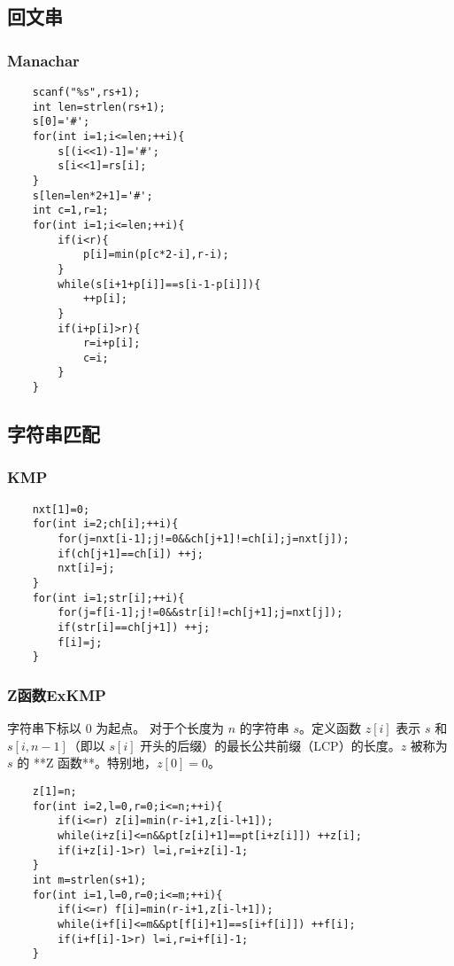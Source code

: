 \documentclass[UTF8]{ctexart}
\begin{document}
\subsection{回文串}
\subsubsection{Manachar}
\begin{lstlisting}
	scanf("%s",rs+1);
	int len=strlen(rs+1);
	s[0]='#';
	for(int i=1;i<=len;++i){
		s[(i<<1)-1]='#';
		s[i<<1]=rs[i];
	}
	s[len=len*2+1]='#';
	int c=1,r=1;
	for(int i=1;i<=len;++i){
		if(i<r){
			p[i]=min(p[c*2-i],r-i);
		}
		while(s[i+1+p[i]]==s[i-1-p[i]]){
			++p[i];
		}
		if(i+p[i]>r){
			r=i+p[i];
			c=i;
		}
	}
\end{lstlisting}
\subsection{字符串匹配}
\subsubsection{KMP}
\begin{lstlisting}
	nxt[1]=0;
	for(int i=2;ch[i];++i){
		for(j=nxt[i-1];j!=0&&ch[j+1]!=ch[i];j=nxt[j]);
		if(ch[j+1]==ch[i]) ++j;
		nxt[i]=j;
	}
	for(int i=1;str[i];++i){
		for(j=f[i-1];j!=0&&str[i]!=ch[j+1];j=nxt[j]);
		if(str[i]==ch[j+1]) ++j;
		f[i]=j;
	}
\end{lstlisting}
\subsubsection{Z函数ExKMP}
字符串下标以 $0$ 为起点。
对于个长度为 $n$ 的字符串 $s$。定义函数 $z[i]$ 表示 $s$ 和 $s[i,n-1]$（即以 $s[i]$ 开头的后缀）的最长公共前缀（LCP）的长度。$z$ 被称为 $s$ 的 **Z 函数**。特别地，$z[0] = 0$。
\begin{lstlisting}
	z[1]=n;
	for(int i=2,l=0,r=0;i<=n;++i){
		if(i<=r) z[i]=min(r-i+1,z[i-l+1]);
		while(i+z[i]<=n&&pt[z[i]+1]==pt[i+z[i]]) ++z[i];
		if(i+z[i]-1>r) l=i,r=i+z[i]-1;
	}
	int m=strlen(s+1);
	for(int i=1,l=0,r=0;i<=m;++i){
		if(i<=r) f[i]=min(r-i+1,z[i-l+1]);
		while(i+f[i]<=m&&pt[f[i]+1]==s[i+f[i]]) ++f[i];
		if(i+f[i]-1>r) l=i,r=i+f[i]-1;
	}
\end{lstlisting}
\end{document}
